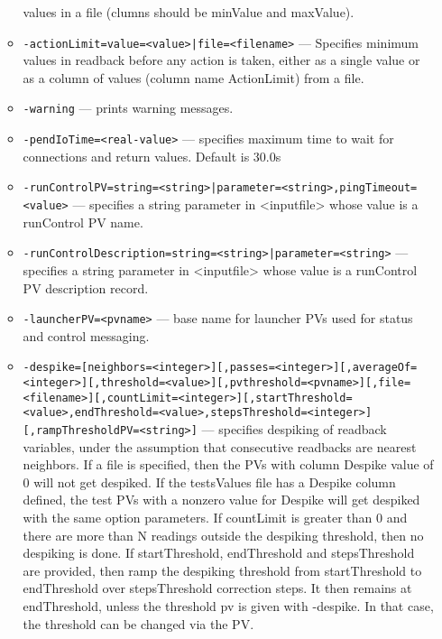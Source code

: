 \begin{itemize}
\begin{itemize}
               values in a file (clumns should be minValue and maxValue).
        \item {\tt -actionLimit=value=<value>|file=<filename>} --- Specifies minimum values in readback before any action is
               taken, either as a single value or as a column of values
               (column name ActionLimit) from a file.
        \item {\tt -warning} --- prints warning messages.
        \item {\tt -pendIoTime=<real-value>} --- specifies maximum time to wait for connections and
               return values.  Default is 30.0s 
        \item {\tt -runControlPV=string=<string>|parameter=<string>,pingTimeout=<value>} --- specifies a string parameter in <inputfile> whose value
               is a runControl PV name.
        \item {\tt -runControlDescription=string=<string>|parameter=<string>} ---
               specifies a string parameter in <inputfile> whose value
               is a runControl PV description record.
        \item {\tt -launcherPV=<pvname>} --- base name for launcher PVs used for status and control messaging.
        \item {\tt -despike=[neighbors=<integer>][,passes=<integer>][,averageOf=<integer>][,threshold=<value>][,pvthreshold=<pvname>][,file=<filename>][,countLimit=<integer>][,startThreshold=<value>,endThreshold=<value>,stepsThreshold=<integer>][,rampThresholdPV=<string>]} ---
                specifies despiking of readback variables,
               under the assumption
               that consecutive readbacks are nearest neighbors. If a file is
               specified, then the PVs with column Despike value of 0 will not
               get despiked. If the testsValues file has a Despike column defined,
               the test PVs with a nonzero value for Despike will get despiked
               with the same option parameters. If countLimit is greater than 0
               and there are more than N readings outside the despiking threshold,
               then no despiking is done.
               If startThreshold, endThreshold and stepsThreshold 
               are provided, then ramp the despiking threshold from startThreshold to 
               endThreshold over stepsThreshold correction steps. It then remains at 
               endThreshold, unless the threshold pv is given with -despike.  
               In that case, the threshold can be changed via the PV.

\end{itemize}
\end{itemize}
